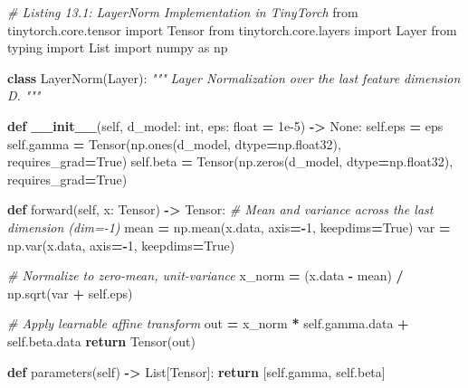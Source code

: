 \documentclass[
  letterpaper,
]{scrbook}
\newenvironment{Shaded}{\begin{snugshade}}{\end{snugshade}}
\newcommand{\BuiltInTok}[1]{#1}
\newcommand{\CommentTok}[1]{\textcolor[rgb]{0.56,0.35,0.01}{\textit{#1}}}
\newcommand{\ControlFlowTok}[1]{\textcolor[rgb]{0.13,0.29,0.53}{\textbf{#1}}}
\newcommand{\DecValTok}[1]{\textcolor[rgb]{0.00,0.00,0.81}{#1}}
\newcommand{\FloatTok}[1]{\textcolor[rgb]{0.00,0.00,0.81}{#1}}
\newcommand{\FunctionTok}[1]{\textcolor[rgb]{0.13,0.29,0.53}{\textbf{#1}}}
\newcommand{\ImportTok}[1]{#1}
\newcommand{\KeywordTok}[1]{\textcolor[rgb]{0.13,0.29,0.53}{\textbf{#1}}}
\newcommand{\NormalTok}[1]{#1}
\newcommand{\OperatorTok}[1]{\textcolor[rgb]{0.81,0.36,0.00}{\textbf{#1}}}
\newcommand{\VariableTok}[1]{\textcolor[rgb]{0.00,0.00,0.00}{#1}}
\begin{document}
\begin{Shaded}
\begin{Highlighting}[]
\CommentTok{\# Listing 13.1: LayerNorm Implementation in TinyTorch}
\ImportTok{from}\NormalTok{ tinytorch.core.tensor }\ImportTok{import}\NormalTok{ Tensor}
\ImportTok{from}\NormalTok{ tinytorch.core.layers }\ImportTok{import}\NormalTok{ Layer}
\ImportTok{from}\NormalTok{ typing }\ImportTok{import}\NormalTok{ List}
\ImportTok{import}\NormalTok{ numpy }\ImportTok{as}\NormalTok{ np}

\KeywordTok{class}\NormalTok{ LayerNorm(Layer):}
    \CommentTok{"""}
\CommentTok{    Layer Normalization over the last feature dimension D.}
\CommentTok{    """}

    \KeywordTok{def} \FunctionTok{\_\_init\_\_}\NormalTok{(}\VariableTok{self}\NormalTok{, d\_model: }\BuiltInTok{int}\NormalTok{, eps: }\BuiltInTok{float} \OperatorTok{=} \FloatTok{1e{-}5}\NormalTok{) }\OperatorTok{{-}\textgreater{}} \VariableTok{None}\NormalTok{:}
        \VariableTok{self}\NormalTok{.eps }\OperatorTok{=}\NormalTok{ eps}
        \VariableTok{self}\NormalTok{.gamma }\OperatorTok{=}\NormalTok{ Tensor(np.ones(d\_model, dtype}\OperatorTok{=}\NormalTok{np.float32), requires\_grad}\OperatorTok{=}\VariableTok{True}\NormalTok{)}
        \VariableTok{self}\NormalTok{.beta }\OperatorTok{=}\NormalTok{ Tensor(np.zeros(d\_model, dtype}\OperatorTok{=}\NormalTok{np.float32), requires\_grad}\OperatorTok{=}\VariableTok{True}\NormalTok{)}

    \KeywordTok{def}\NormalTok{ forward(}\VariableTok{self}\NormalTok{, x: Tensor) }\OperatorTok{{-}\textgreater{}}\NormalTok{ Tensor:}
        \CommentTok{\# Mean and variance across the last dimension (dim={-}1)}
\NormalTok{        mean }\OperatorTok{=}\NormalTok{ np.mean(x.data, axis}\OperatorTok{={-}}\DecValTok{1}\NormalTok{, keepdims}\OperatorTok{=}\VariableTok{True}\NormalTok{)}
\NormalTok{        var }\OperatorTok{=}\NormalTok{ np.var(x.data, axis}\OperatorTok{={-}}\DecValTok{1}\NormalTok{, keepdims}\OperatorTok{=}\VariableTok{True}\NormalTok{)}

        \CommentTok{\# Normalize to zero{-}mean, unit{-}variance}
\NormalTok{        x\_norm }\OperatorTok{=}\NormalTok{ (x.data }\OperatorTok{{-}}\NormalTok{ mean) }\OperatorTok{/}\NormalTok{ np.sqrt(var }\OperatorTok{+} \VariableTok{self}\NormalTok{.eps)}

        \CommentTok{\# Apply learnable affine transform}
\NormalTok{        out }\OperatorTok{=}\NormalTok{ x\_norm }\OperatorTok{*} \VariableTok{self}\NormalTok{.gamma.data }\OperatorTok{+} \VariableTok{self}\NormalTok{.beta.data}
        \ControlFlowTok{return}\NormalTok{ Tensor(out)}

    \KeywordTok{def}\NormalTok{ parameters(}\VariableTok{self}\NormalTok{) }\OperatorTok{{-}\textgreater{}}\NormalTok{ List[Tensor]:}
        \ControlFlowTok{return}\NormalTok{ [}\VariableTok{self}\NormalTok{.gamma, }\VariableTok{self}\NormalTok{.beta]}
\end{Highlighting}
\end{Shaded}
\end{document}
